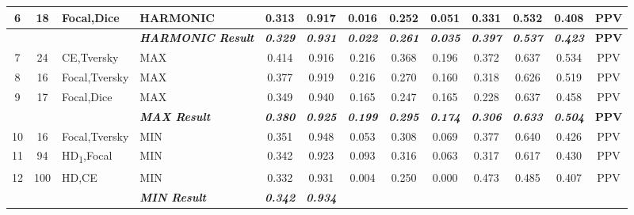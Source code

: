 \begin{table}[H]
{\begin{tabular}{ccl|l|c|c|c|c|c|c|c|c|c|}
  \multicolumn{1}{|c|}{6} &
    \multicolumn{1}{c|}{18} &
    Focal,Dice &
    HARMONIC &
    0.313 &
    0.917 &
    0.016 &
    0.252 &
    0.051 &
    0.331 &
    0.532 &
    0.408 &
    PPV \\ \hline
  \textbf{} &
    \textbf{} &
    \textbf{} &
    \textit{\textbf{HARMONIC Result}} &
    \textit{\textbf{0.329}} &
    \textit{\textbf{0.931}} &
    \textit{\textbf{0.022}} &
    \textit{\textbf{0.261}} &
    \textit{\textbf{0.035}} &
    \textit{\textbf{0.397}} &
    \textit{\textbf{0.537}} &
    \textit{\textbf{0.423}} &
    \textbf{PPV} \\ \hline
  \multicolumn{1}{|c|}{7} &
    \multicolumn{1}{c|}{24} &
    CE,Tversky &
    MAX &
    0.414 &
    0.916 &
    0.216 &
    0.368 &
    0.196 &
    0.372 &
    0.637 &
    0.534 &
    PPV \\ \hline
  \multicolumn{1}{|c|}{8} &
    \multicolumn{1}{c|}{16} &
    Focal,Tversky &
    MAX &
    0.377 &
    0.919 &
    0.216 &
    0.270 &
    0.160 &
    0.318 &
    0.626 &
    0.519 &
    PPV \\ \hline
  \multicolumn{1}{|c|}{9} &
    \multicolumn{1}{c|}{17} &
    Focal,Dice &
    MAX &
    0.349 &
    0.940 &
    0.165 &
    0.247 &
    0.165 &
    0.228 &
    0.637 &
    0.458 &
    PPV \\ \hline
  \textbf{} &
    \textbf{} &
    \textbf{} &
    \textit{\textbf{MAX Result}} &
    \textit{\textbf{0.380}} &
    \textit{\textbf{0.925}} &
    \textit{\textbf{0.199}} &
    \textit{\textbf{0.295}} &
    \textit{\textbf{0.174}} &
    \textit{\textbf{0.306}} &
    \textit{\textbf{0.633}} &
    \textit{\textbf{0.504}} &
    \textbf{PPV} \\ \hline
  \multicolumn{1}{|c|}{10} &
    \multicolumn{1}{c|}{16} &
    Focal,Tversky &
    MIN &
    0.351 &
    0.948 &
    0.053 &
    0.308 &
    0.069 &
    0.377 &
    0.640 &
    0.426 &
    PPV \\ \hline
  \multicolumn{1}{|c|}{11} &
    \multicolumn{1}{c|}{94} &
    HD\textsubscript{1},Focal &
    MIN &
    0.342 &
    0.923 &
    0.093 &
    0.316 &
    0.063 &
    0.317 &
    0.617 &
    0.430 &
    PPV \\ \hline
  \multicolumn{1}{|c|}{12} &
    \multicolumn{1}{c|}{100} &
    HD,CE &
    MIN &
    0.332 &
    0.931 &
    0.004 &
    0.250 &
    0.000 &
    0.473 &
    0.485 &
    0.407 &
    PPV \\ \hline
  \textbf{} &
    \textbf{} &
    \textbf{} &
    \textit{\textbf{MIN Result}} &
    \textit{\textbf{0.342}} &
    \textit{\textbf{0.934}} &

\end{tabular}}
\end{table}
